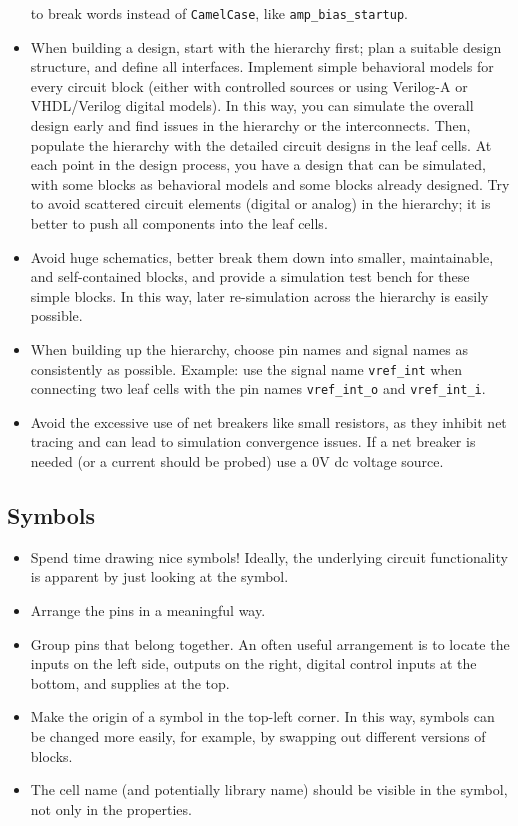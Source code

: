 \documentclass[
  a4paper,
  DIV=11,
  numbers=noendperiod]{scrartcl}
\providecommand{\tightlist}{%
  \setlength{\itemsep}{0pt}\setlength{\parskip}{0pt}}\usepackage{longtable,booktabs,array}
\begin{document}
\begin{itemize}
  to break words instead of \texttt{CamelCase}, like
  \texttt{amp\_bias\_startup}.
\item
  When building a design, start with the hierarchy first; plan a
  suitable design structure, and define all interfaces. Implement simple
  behavioral models for every circuit block (either with controlled
  sources or using Verilog-A or VHDL/Verilog digital models). In this
  way, you can simulate the overall design early and find issues in the
  hierarchy or the interconnects. Then, populate the hierarchy with the
  detailed circuit designs in the leaf cells. At each point in the
  design process, you have a design that can be simulated, with some
  blocks as behavioral models and some blocks already designed. Try to
  avoid scattered circuit elements (digital or analog) in the hierarchy;
  it is better to push all components into the leaf cells.
\item
  Avoid huge schematics, better break them down into smaller,
  maintainable, and self-contained blocks, and provide a simulation test
  bench for these simple blocks. In this way, later re-simulation across
  the hierarchy is easily possible.
\item
  When building up the hierarchy, choose pin names and signal names as
  consistently as possible. Example: use the signal name
  \texttt{vref\_int} when connecting two leaf cells with the pin names
  \texttt{vref\_int\_o} and \texttt{vref\_int\_i}.
\item
  Avoid the excessive use of net breakers like small resistors, as they
  inhibit net tracing and can lead to simulation convergence issues. If
  a net breaker is needed (or a current should be probed) use a 0V dc
  voltage source.
\end{itemize}

\subsection{Symbols}\label{symbols}

\begin{itemize}
\tightlist
\item
  Spend time drawing nice symbols! Ideally, the underlying circuit
  functionality is apparent by just looking at the symbol.
\item
  Arrange the pins in a meaningful way.
\item
  Group pins that belong together. An often useful arrangement is to
  locate the inputs on the left side, outputs on the right, digital
  control inputs at the bottom, and supplies at the top.
\item
  Make the origin of a symbol in the top-left corner. In this way,
  symbols can be changed more easily, for example, by swapping out
  different versions of blocks.
\item
  The cell name (and potentially library name) should be visible in the
  symbol, not only in the properties.
\end{itemize}
\end{document}
